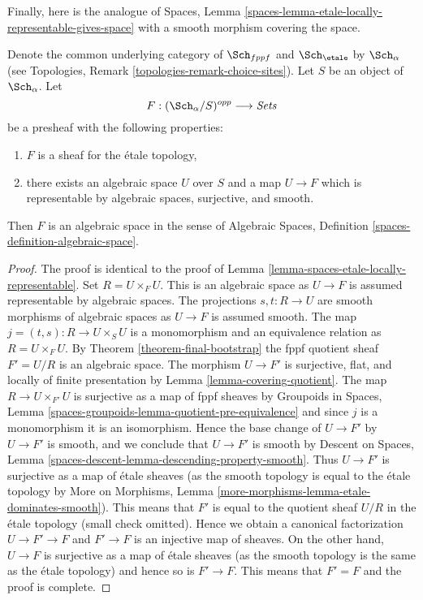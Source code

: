 \noindent
Finally, here is the analogue of
Spaces, Lemma \ref{spaces-lemma-etale-locally-representable-gives-space}
with a smooth morphism covering the space.

\begin{lemma}
\label{lemma-spaces-smooth-locally-representable}
Denote the common underlying category of $\Sch_{fppf}$ and $\Sch_\etale$ by
$\Sch_\alpha$ (see Topologies, Remark \ref{topologies-remark-choice-sites}).
Let $S$ be an object of $\Sch_\alpha$. Let
$$
F : (\Sch_\alpha/S)^{opp} \longrightarrow \textit{Sets}
$$
be a presheaf with the following properties:
\begin{enumerate}
\item $F$ is a sheaf for the \'etale topology,
\item there exists an algebraic space $U$ over $S$
and a map $U \to F$ which is representable by
algebraic spaces, surjective, and smooth.
\end{enumerate}
Then $F$ is an algebraic space in the sense of
Algebraic Spaces, Definition \ref{spaces-definition-algebraic-space}.
\end{lemma}

\begin{proof}
The proof is identical to the proof of
Lemma \ref{lemma-spaces-etale-locally-representable}.
Set $R = U \times_F U$. This is an algebraic space as $U \to F$ is assumed
representable by algebraic spaces. The projections $s, t : R \to U$ are
smooth morphisms of algebraic spaces as $U \to F$ is assumed smooth.
The map $j = (t, s) : R \to U \times_S U$ is a monomorphism and an
equivalence relation as $R = U \times_F U$. By
Theorem \ref{theorem-final-bootstrap}
the fppf quotient sheaf $F' = U/R$ is an algebraic space.
The morphism $U \to F'$ is surjective, flat, and locally of finite
presentation by Lemma \ref{lemma-covering-quotient}.
The map $R \to U \times_{F'} U$ is surjective as a map of fppf
sheaves by Groupoids in Spaces, Lemma
\ref{spaces-groupoids-lemma-quotient-pre-equivalence}
and since $j$ is a monomorphism it is an isomorphism.
Hence the base change of $U \to F'$ by $U \to F'$ is smooth,
and we conclude that $U \to F'$ is smooth by
Descent on Spaces, Lemma \ref{spaces-descent-lemma-descending-property-smooth}.
Thus $U \to F'$ is surjective as a map of \'etale sheaves (as the
smooth topology is equal to the \'etale topology by
More on Morphisms, Lemma \ref{more-morphisms-lemma-etale-dominates-smooth}).
This means that $F'$ is equal to the quotient sheaf $U/R$
in the \'etale topology (small check omitted). Hence we obtain
a canonical factorization $U \to F' \to F$ and $F' \to F$ is an injective
map of sheaves. On the other hand, $U \to F$ is surjective as a map
of \'etale sheaves (as the smooth topology is the same as the
\'etale topology) and hence so is $F' \to F$. This means that $F' = F$
and the proof is complete.
\end{proof}













